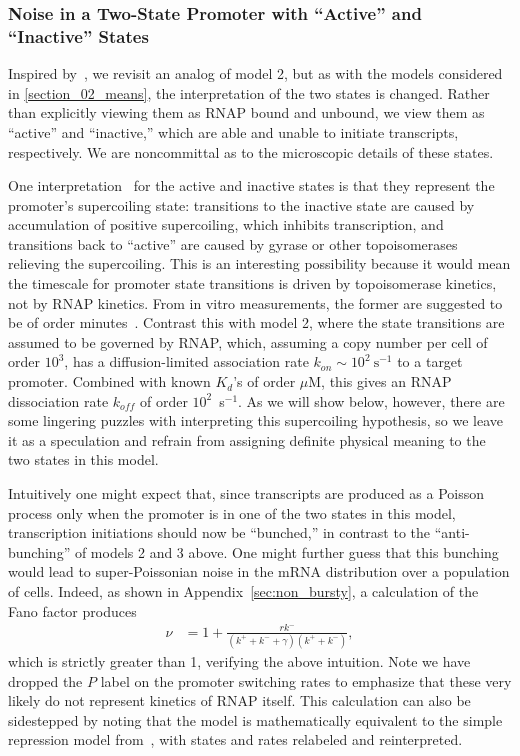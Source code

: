 \subsubsection{Noise in a Two-State Promoter with ``Active'' and ``Inactive''
States}

Inspired by~\cite{Razo-Mejia2020}, we revisit an analog of model 2, but as with
the models considered in \ref{section_02_means}, the interpretation of the two
states is changed. Rather than explicitly viewing them as RNAP bound and
unbound, we view them as ``active'' and ``inactive,'' which are able and unable
to initiate transcripts, respectively. We are noncommittal as to the microscopic
details of these states.

One interpretation~\cite{Chong2014, Sevier2016} for the active and inactive
states is that they represent the promoter's supercoiling state: transitions to
the inactive state are caused by accumulation of positive supercoiling, which
inhibits transcription, and transitions back to ``active'' are caused by gyrase
or other topoisomerases relieving the supercoiling. This is an interesting
possibility because it would mean the timescale for promoter state transitions
is driven by topoisomerase kinetics, not by RNAP kinetics. From in vitro
measurements, the former are suggested to be of order minutes~\cite{Chong2014}.
Contrast this with model 2, where the state transitions are assumed to be
governed by RNAP, which, assuming a copy number per cell of order $10^3$, has a
diffusion-limited association rate $k_{on} \sim 10^2~\text{s}^{-1}$ to a target
promoter. Combined with known $K_d$'s of order $\mu$M, this gives an RNAP
dissociation rate $k_{off}$ of order $10^2$~s$^{-1}$. As we will show below,
however, there are some lingering puzzles with interpreting this supercoiling
hypothesis, so we leave it as a speculation and refrain from assigning definite
physical meaning to the two states in this model.

Intuitively one might expect that, since transcripts are produced as a Poisson
process only when the promoter is in one of the two states in this model,
transcription initiations should now be ``bunched,'' in contrast to the
``anti-bunching'' of models 2 and 3 above. One might further guess that this
bunching would lead to super-Poissonian noise in the mRNA distribution over a
population of cells.  Indeed, as shown in Appendix~\ref{sec:non_bursty}, a
calculation of the Fano factor produces
\begin{align}
\nu &= 1 + \frac{r k^-}{(k^+ + k^- + \gamma)(k^+ + k^-)},
\label{eq:model4_fano}
\end{align}
which is strictly greater than 1, verifying the above intuition. Note we have
dropped the $P$ label on the promoter switching rates to emphasize that these
very likely do not represent kinetics of RNAP itself. This calculation can also
be sidestepped by noting that the model is mathematically equivalent to the
simple repression model from~\cite{Jones2014}, with states and rates relabeled
and reinterpreted.

